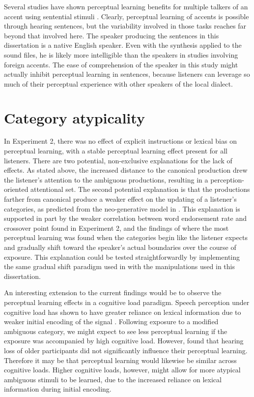 Several studies have shown perceptual learning benefits for multiple talkers of an accent using sentential stimuli \citep[and others]{Bradlow2008}.  
Clearly, perceptual learning of accents is possible through hearing sentences, but the variability involved in those tasks reaches far beyond that involved here.  
The speaker producing the sentences in this dissertation is a native English speaker.
Even with the synthesis applied to the sound files, he is likely more intelligible than the speakers in studies involving foreign accents.
The ease of comprehension of the speaker in this study might actually inhibit perceptual learning in sentences, because listeners can leverage so much of their perceptual experience with other speakers of the local dialect.

\section{Category atypicality}

In Experiment 2, there was no effect of explicit instructions or lexical bias on perceptual learning, with a stable perceptual learning effect present for all listeners.
There are two potential, non-exclusive explanations for the lack of effects.
As stated above, the increased distance to the canonical production drew the listener's attention to the ambiguous productions, resulting in a perception-oriented attentional set.
The second potential explanation is that the productions farther from canonical produce a weaker effect on the updating of a listener's categories, as predicted from the neo-generative model in \citep{Pierrehumbert2002}.
This explanation is supported in part by the weaker correlation between word endorsement rate and crossover point found in Experiment 2, and the findings of \citet{Sumner2011} where the most perceptual learning was found when the categories begin like the listener expects and gradually shift toward the speaker's actual boundaries over the course of exposure.
This explanation could be tested straightforwardly by implementing the same gradual shift paradigm used in \citet{Sumner2011} with the manipulations used in this dissertation.

An interesting extension to the current findings would be to observe the perceptual learning effects in a cognitive load paradigm.  Speech perception under cognitive load has shown to have greater reliance on lexical information due to weaker initial encoding of the signal \citep{Mattys2011}.  Following exposure to a modified ambiguous category, we might expect to see less perceptual learning if the exposure was accompanied by high cognitive load.  However, \citet{Scharenborg2014} found that hearing loss of older participants did not significantly influence their perceptual learning.  Therefore it may be that perceptual learning would likewise be similar across cognitive loads.
Higher cognitive loads, however, might allow for more atypical ambiguous stimuli to be learned, due to the increased reliance on lexical information during initial encoding.

